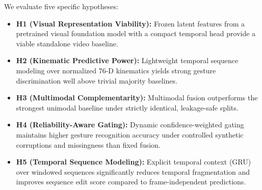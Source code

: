 \documentclass[10pt,journal]{IEEEtran}
\begin{document}
We evaluate five specific hypotheses:
\begin{itemize}
    \item \textbf{H1 (Visual Representation Viability):} Frozen latent features from a pretrained visual foundation model with a compact temporal head provide a viable standalone video baseline.
    \item \textbf{H2 (Kinematic Predictive Power):} Lightweight temporal sequence modeling over normalized 76-D kinematics yields strong gesture discrimination well above trivial majority baselines.
    \item \textbf{H3 (Multimodal Complementarity):} Multimodal fusion outperforms the strongest unimodal baseline under strictly identical, leakage-safe splits.
    \item \textbf{H4 (Reliability-Aware Gating):} Dynamic confidence-weighted gating maintains higher gesture recognition accuracy under controlled synthetic corruptions and missingness than fixed fusion.
    \item \textbf{H5 (Temporal Sequence Modeling):} Explicit temporal context (GRU) over windowed sequences significantly reduces temporal fragmentation and improves sequence edit score compared to frame-independent predictions.
\end{itemize}
\end{document}
